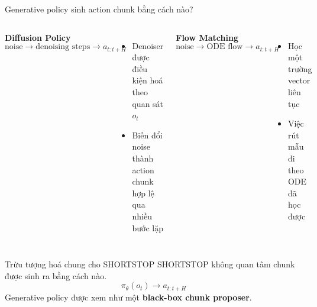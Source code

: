 \documentclass[aspectratio=169]{beamer}
\begin{document}
\begin{frame}[t,shrink=8]{Generative policy sinh action chunk bằng cách nào?}
\begin{columns}[T]

\textbf{Diffusion Policy}
\[
\text{noise}
\rightarrow
\text{denoising steps}
\rightarrow
a_{t:t+H}
\]
\begin{itemize}
    \item Denoiser được điều kiện hoá theo quan sát $o_t$
    \item Biến đổi noise thành action chunk hợp lệ qua nhiều bước lặp
\end{itemize}

\textbf{Flow Matching}
\[
\text{noise}
\rightarrow
\text{ODE flow}
\rightarrow
a_{t:t+H}
\]
\begin{itemize}
    \item Học một trường vector liên tục
    \item Việc rút mẫu đi theo ODE đã học được
\end{itemize}

\end{columns}
\vspace{7pt}

\begin{alertblock}{Trừu tượng hoá chung cho SHORTSTOP}
SHORTSTOP không quan tâm chunk được sinh ra bằng cách nào.
\[
\boxed{
\pi_\theta(o_t)
\rightarrow
a_{t:t+H}
}
\]
Generative policy được xem như một \textbf{black-box chunk proposer}.
\end{alertblock}
\end{frame}

\end{document}
